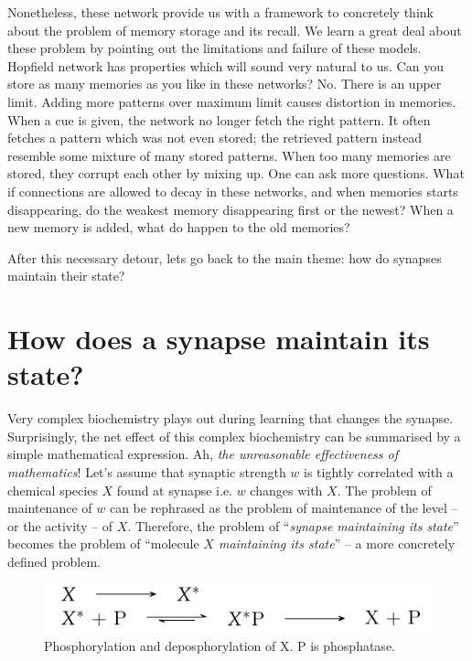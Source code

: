 \documentclass[]{resonance}
\begin{document}

Nonetheless, these network provide us with a framework to concretely think about
the problem of memory storage and its recall. We learn a great deal about these
problem by pointing out the limitations and failure of these models. Hopfield
network has properties which will sound very natural to us. Can you store as
many memories as you like in these networks? No. There is an upper limit. Adding
more patterns over maximum limit causes distortion in memories. When a cue is
given, the network no longer fetch the right pattern. It often fetches a pattern
which was not even stored; the retrieved pattern instead resemble some mixture
of many stored patterns. When too many memories are stored, they corrupt each
other by mixing up. One can ask more questions. What if connections are allowed 
to decay in these networks, and when memories starts disappearing, do the
weakest memory disappearing first or the newest? When a new memory is added,
what do happen to the old memories?

After this necessary detour, lets go back to the main theme: how do synapses
maintain their state?

\section{How does a synapse maintain its state?}

Very complex biochemistry plays out during learning that changes the synapse.
Surprisingly, the net effect of this complex biochemistry can be summarised by a simple
mathematical expression. Ah, \emph{the unreasonable effectiveness of
mathematics}\cite{unreasonable_math}! Let's assume that synaptic strength $w$ is
tightly correlated with a chemical species $X$ found at synapse i.e. $w$ changes
with $X$.  The problem of maintenance of $w$ can be rephrased as the problem of
maintenance of the level -- or the activity -- of $X$. Therefore, the problem of
``\emph{synapse maintaining its state}'' becomes the problem of ``molecule
\emph{$X$ maintaining its state}'' -- a more concretely defined problem.

\begin{figure}[h!]
    \caption{Phosphorylation and deposphorylation of X. P is phosphatase.}\label{fig:model}
    \includegraphics[]{./fig_model.pdf}
\end{figure}
\end{document}
